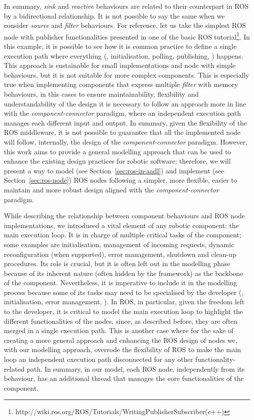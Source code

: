 In summary, \textit{sink} and \textit{reactive} behaviours are related to their counterpart in ROS by a bidirectional relationship. It is not possible to say the same when we consider \textit{source} and \textit{filter} behaviours. For reference, let us take the simplest ROS node with publisher functionalities presented in one of the basic ROS tutorial\footnote{http://wiki.ros.org/ROS/Tutorials/WritingPublisherSubscriber(c++)}. In this example, it is possible to see how it is common practice to define a single execution path where everything (\eg, initialisation, polling, publishing, \etc) happens. This approach is sustainable for small implementations and node with simple behaviours, but it is not suitable for more complex components. This is especially true when implementing components that express multiple \textit{filter} with memory behaviours, in this cases to ensure maintainability, flexibility and understandability of the design it is necessary to follow an approach more in line with the \textit{component-connector} paradigm, where an independent execution path manages each different input and output. In summary, given the flexibility of the ROS middleware, it is not possible to guarantee that all the implemented node will follow, internally, the design of the \textit{component-connector} paradigm. However, this work aims to provide a general modelling approach that can be used to enhance the existing design practices for robotic software; therefore, we will present a way to model (see Section~\ref{sec:ros-in-aadl}) and implement (see Section~\ref{sec:ros-node}) ROS nodes following a simpler, more flexible, easier to maintain and more robust design aligned with the \textit{component-connector} paradigm.

While describing the relationship between component behaviours and ROS node implementations, we introduced a vital element of any robotic component: the main execution loop. It is in charge of multiple critical tasks of the component; some examples are initialisation, management of incoming requests, dynamic reconfiguration (when supported), error management, shutdown and clean-up procedures. Its role is crucial, but it is often left out in the modelling phase because of its inherent nature (often hidden by the framework) as the backbone of the component. Nevertheless, it is imperative to include it in the modelling process because some of its tasks may need to be specialised by the developer (\eg, initialisation, error management, \etc). In ROS, in particular, given the freedom left to the developer, it is critical to model the main execution loop to highlight the different functionalities of the nodes, since, as described before, they are often merged in a single execution path. This is another case where for the sake of creating a more general approach and enhancing the ROS design of nodes we, with our modelling approach, overrode the flexibility of ROS to make the main loop an independent execution path disconnected for any other functionality-related path. In summary, in our model, each ROS node, independently from its behaviour, has an additional thread that manages the core functionalities of the component.

